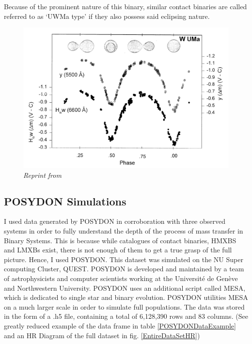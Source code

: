 \documentclass[12pt, a4paper]{article}
\begin{document}
        Because of the prominent nature of this binary, similar contact binaries are called referred to as `UWMa type' if they also possess said eclipsing nature. 

        \begin{figure}[H]
            \centering
            \includegraphics[scale= .3]{figs/reused-figs/WUMaLightcurve.png}
            \caption{\textit{Reprint from~\parencite{Morgan_1997}}}
            \label{WUMaLightcruve}
        \end{figure}


    \subsection{POSYDON Simulations}
         I used data generated by POSYDON \parencite{Fragos_2023} in corroboration with three observed systems in order to fully understand the depth of the process of mass transfer in Binary Systems. This is because while catalogues of contact binaries, HMXBS and LMXBs exist, there is not enough of them to get a true grasp of the full picture. Hence, I used POSYDON. This dataset was simulated on the NU Super computing Cluster, QUEST. POSYDON is developed and maintained by a team of astrophysicists and computer scientists working at the Université de Genève and Northwestern University. POSYDON uses an additional script called MESA, which is dedicated to single star and binary evolution. POSYDON utilities MESA on a much larger scale in order to simulate full populations. The data was stored in the form of a .h5 file, containing a total of 6,128,390 rows and 83 columns. (See greatly reduced example of the data frame in table \ref{POSYDONDataExample} and an HR Diagram of the full dataset in fig. \ref{EntireDataSetHR})
\end{document}
